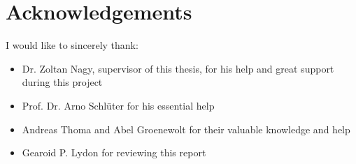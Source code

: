 \chapter*{Acknowledgements}

I would like to sincerely thank:
\begin{itemize}
\item Dr. Zoltan Nagy, supervisor of this thesis, for his help and great support during this project
\item Prof. Dr. Arno Schl\"{u}ter for his essential help
\item Andreas Thoma and Abel Groenewolt for their valuable knowledge and help
\item Gearoid P. Lydon for reviewing this report
\end{itemize}

 \cleardoublepage




